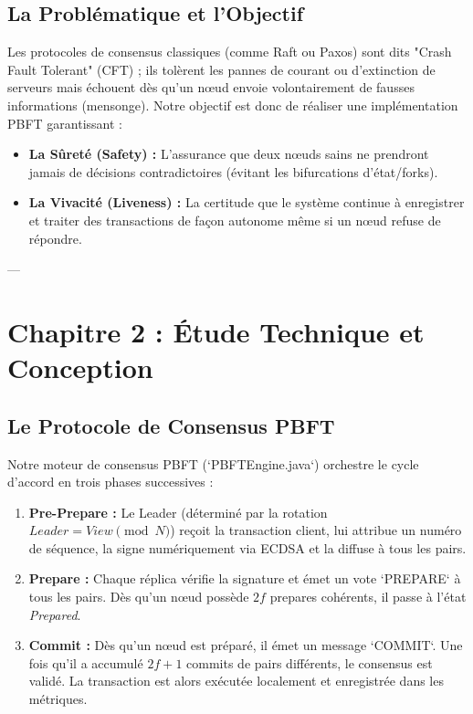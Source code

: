 \documentclass[11pt,a4paper]{article}
\begin{document}
\subsection{La Problématique et l'Objectif}
Les protocoles de consensus classiques (comme Raft ou Paxos) sont dits "Crash Fault Tolerant" (CFT) ; ils tolèrent les pannes de courant ou d'extinction de serveurs mais échouent dès qu'un nœud envoie volontairement de fausses informations (mensonge). 
Notre objectif est donc de réaliser une implémentation PBFT garantissant :
\begin{itemize}
    \item \textbf{La Sûreté (Safety) :} L'assurance que deux nœuds sains ne prendront jamais de décisions contradictoires (évitant les bifurcations d'état/forks).
    \item \textbf{La Vivacité (Liveness) :} La certitude que le système continue à enregistrer et traiter des transactions de façon autonome même si un nœud refuse de répondre.
\end{itemize}

---

\section{Chapitre 2 : Étude Technique et Conception}

\subsection{Le Protocole de Consensus PBFT}
Notre moteur de consensus PBFT (`PBFTEngine.java`) orchestre le cycle d'accord en trois phases successives :
\begin{enumerate}
    \item \textbf{Pre-Prepare :} Le Leader (déterminé par la rotation $Leader = View \pmod N$) reçoit la transaction client, lui attribue un numéro de séquence, la signe numériquement via ECDSA et la diffuse à tous les pairs.
    \item \textbf{Prepare :} Chaque réplica vérifie la signature et émet un vote `PREPARE` à tous les pairs. Dès qu'un nœud possède $2f$ prepares cohérents, il passe à l'état \textit{Prepared}.
    \item \textbf{Commit :} Dès qu'un nœud est préparé, il émet un message `COMMIT`. Une fois qu'il a accumulé $2f+1$ commits de pairs différents, le consensus est validé. La transaction est alors exécutée localement et enregistrée dans les métriques.
\end{enumerate}
\end{document}
